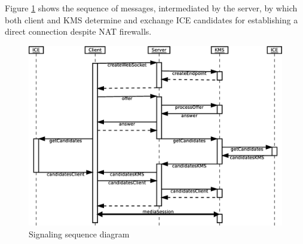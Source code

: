 \documentclass[10pt,conference]{IEEEtran}
\begin{document}
Figure \ref{fig:signaling2} shows the sequence of messages, intermediated by the server, by which both client and \gls{KMS} determine and exchange \gls{ICE} candidates for establishing a direct connection despite \gls{NAT} firewalls.




\begin{figure}
    \centering
    \includegraphics[width=\linewidth]{figures/signaling2}
    \caption{Signaling sequence diagram}
    \label{fig:signaling2}
\end{figure} 
\end{document}
